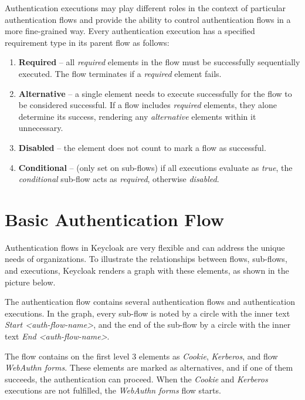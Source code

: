 Authentication executions may play different roles in the context of particular authentication flows and provide the ability to control authentication flows in a more fine-grained way. \cite{keycloak-auth-flows}
\newline
\newline
Every authentication execution has a specified requirement type in its parent flow as follows:

\begin{enumerate}
    \item \textbf{Required} -- all \textit{required} elements in the flow must be successfully sequentially executed. The flow terminates if a \textit{required} element fails.
    \item \textbf{Alternative} -- a single element needs to execute successfully for the flow to be considered successful. If a flow includes \textit{required} elements, they alone determine its success, rendering any \textit{alternative} elements within it unnecessary.
    \item \textbf{Disabled} -- the element does not count to mark a flow as successful.
    \item \textbf{Conditional} -- (only set on sub-flows) if all executions evaluate as \textit{true}, the \textit{conditional} sub-flow acts as \textit{required}, otherwise \textit{disabled}.
\end{enumerate}

\newpage

\section{Basic Authentication Flow}
Authentication flows in Keycloak are very flexible and can address the unique needs of organizations.
To illustrate the relationships between flows, sub-flows, and executions, Keycloak renders a graph with these elements, as shown in the picture below.

The authentication flow contains several authentication flows and authentication executions.
In the graph, every sub-flow is noted by a circle with the inner text \textit{Start <auth-flow-name>}, and the end of the sub-flow by a circle with the inner text \textit{End <auth-flow-name>}.

The flow contains on the first level 3 elements as \textit{Cookie}, \textit{Kerberos}, and flow \textit{WebAuthn forms}.
These elements are marked as alternatives, and if one of them succeeds, the authentication can proceed.
When the \textit{Cookie} and \textit{Kerberos} executions are not fulfilled, the \textit{WebAuthn forms} flow starts.

